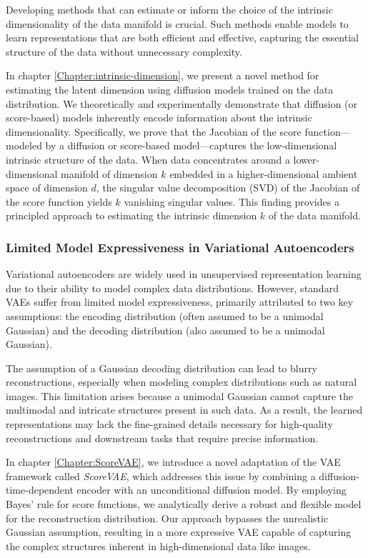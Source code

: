 Developing methods that can estimate or inform the choice of the intrinsic dimensionality of the data manifold is crucial. Such methods enable models to learn representations that are both efficient and effective, capturing the essential structure of the data without unnecessary complexity.

In chapter \ref{Chapter:intrinsic-dimension}, we present a novel method for estimating the latent dimension using diffusion models trained on the data distribution. We theoretically and experimentally demonstrate that diffusion (or score-based) models inherently encode information about the intrinsic dimensionality. Specifically, we prove that the Jacobian of the score function—modeled by a diffusion or score-based model—captures the low-dimensional intrinsic structure of the data. When data concentrates around a lower-dimensional manifold of dimension \( k \) embedded in a higher-dimensional ambient space of dimension \( d \), the singular value decomposition (SVD) of the Jacobian of the score function yields \( k \) vanishing singular values. This finding provides a principled approach to estimating the intrinsic dimension \( k \) of the data manifold.

\subsubsection{Limited Model Expressiveness in Variational Autoencoders}

Variational autoencoders are widely used in unsupervised representation learning due to their ability to model complex data distributions. However, standard VAEs suffer from limited model expressiveness, primarily attributed to two key assumptions: the encoding distribution (often assumed to be a unimodal Gaussian) and the decoding distribution (also assumed to be a unimodal Gaussian).

The assumption of a Gaussian decoding distribution can lead to blurry reconstructions, especially when modeling complex distributions such as natural images. This limitation arises because a unimodal Gaussian cannot capture the multimodal and intricate structures present in such data. As a result, the learned representations may lack the fine-grained details necessary for high-quality reconstructions and downstream tasks that require precise information.

In chapter \ref{Chapter:ScoreVAE}, we introduce a novel adaptation of the VAE framework called \textit{ScoreVAE}, which addresses this issue by combining a diffusion-time-dependent encoder with an unconditional diffusion model. By employing Bayes' rule for score functions, we analytically derive a robust and flexible model for the reconstruction distribution. Our approach bypasses the unrealistic Gaussian assumption, resulting in a more expressive VAE capable of capturing the complex structures inherent in high-dimensional data like images.

